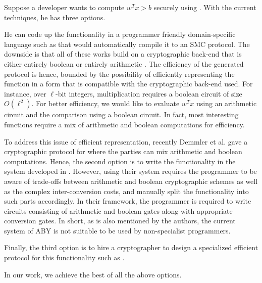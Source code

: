 Suppose a developer wants to compute $w^Tx >b$ securely using
\mpc. With the current techniques, he has three options. 
\begin{tiret}
\item He can code up the functionality in a programmer friendly
  domain-specific language such as
  \cite{lambdaps,wysteria,oblivm,smcl} that would automatically
  compile it to an SMC protocol. The downside is that all of these
  works build on a cryptographic back-end that is either entirely
  boolean \cite{yao,gmw} or entirely arithmetic \cite{homo}. The efficiency of the generated \mpc protocol is hence, bounded by the possibility of efficiently representing the function in a form that is compatible with the cryptographic back-end used. For instance, over $\ell$-bit integers, multiplication requires a boolean circuit of size  $O(\ell^2)$. 
For better efficiency, we would like to evaluate $w^Tx$ using an arithmetic circuit and the comparison using a boolean circuit.
In fact, most interesting functions require a mix of arithmetic and boolean computations for efficiency.

\item To address this issue of efficient representation, recently Demmler et al. \cite{aby} gave a cryptographic protocol for \mpc where the parties can mix arithmetic and boolean computations.
Hence, the second option is to write the functionality in the system developed in \cite{aby}.
However, using their system requires the programmer to be aware of
trade-offs between arithmetic and boolean cryptographic
schemes as well as the complex inter-conversion costs, and manually split the functionality into such parts accordingly. In
their framework, the programmer is required to write circuits
consisting of  arithmetic and boolean gates along with appropriate
conversion gates. In short, as is also mentioned by the authors, the current system of ABY is not suitable
to be used by non-specialist programmers. 

\item Finally, the third option is to hire a cryptographer to design a specialized efficient protocol for this functionality such as \cite{shafindss,wu,minionn}. 
\end{tiret}
In our work, we achieve the best of all the above options. 



